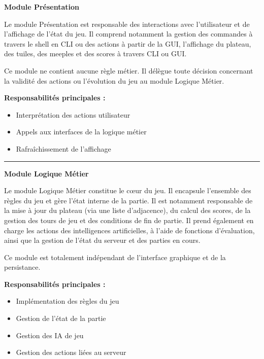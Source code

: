 \documentclass[11pt]{article}
\begin{document}
\begin{tcolorbox}[
  colback=gray!5,
  colframe=black,
  boxrule=0.8pt,
  arc=2mm
]
\large\textbf{Module Présentation}\normalsize
\vspace{0.3em}

Le module Présentation est responsable des interactions avec l’utilisateur et de l’affichage de l’état du jeu.
Il comprend notamment la gestion des commandes à travers le shell en CLI ou des actions à partir de la GUI, l’affichage du plateau, des tuiles, des meeples et des scores à travers CLI ou GUI.

Ce module ne contient aucune règle métier. Il délègue toute décision concernant la validité des actions ou l’évolution du jeu au module Logique Métier.

\vspace{0.5em}
\textbf{Responsabilités principales :}
\begin{itemize}
  \item[$\bullet$] Interprétation des actions utilisateur


  \item[$\bullet$] Appels aux interfaces de la logique métier


  \item[$\bullet$] Rafraîchissement de l’affichage
\end{itemize}

\medskip
\hrule
\medskip

\large\textbf{Module Logique Métier}\normalsize
\vspace{0.3em}

Le module Logique Métier constitue le cœur du jeu.
Il encapsule l’ensemble des règles du jeu et gère l’état interne de la partie.
Il est notamment responsable de la mise à jour du plateau (via une liste d’adjacence), du calcul des scores, de la gestion des tours de jeu et des conditions de fin de partie. 
Il prend également en charge les actions des intelligences artificielles, à l’aide de fonctions d’évaluation, ainsi que la gestion de l’état du serveur et des parties en cours.

Ce module est totalement indépendant de l’interface graphique et de la persistance.

\vspace{0.5em}
\textbf{Responsabilités principales :}

\begin{itemize}
  \item[$\bullet$] Implémentation des règles du jeu 
  \item[$\bullet$] Gestion de l’état de la partie 
  \item[$\bullet$] Gestion des IA de jeu 
  \item[$\bullet$] Gestion des actions liées au serveur
\end{itemize}



\end{tcolorbox}
\end{document}
